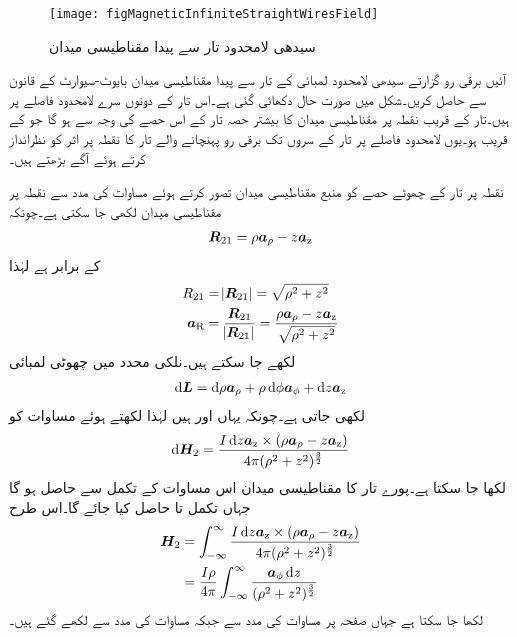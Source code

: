 \begin{figure}
\centering
\texttt{[image: figMagneticInfiniteStraightWiresField]}
\caption{سیدھی لامحدود تار سے پیدا مقناطیسی میدان}
\label{شکل_مقناطیسی_سیدھی_لامحدود_تار_کا_میدان}
\end{figure}
آئیں برقی رو گزارتے سیدھی  لامحدود لمبائی کے تار سے پیدا مقناطیسی میدان بایوٹ-سیوارٹ کے قانون سے حاصل کریں۔شکل  میں صورت حال دکھائی گئی ہے۔اس تار کے دونوں سرے لامحدود فاصلے پر ہیں۔تار کے قریب نقطہ  پر مقناطیسی میدان کا بیشتر حصہ تار کے اس حصے کی وجہ سے ہو گا جو  کے قریب ہو۔یوں لامحدود فاصلے پر تار کے سروں تک برقی رو پہنچانے  والے تار کا نقطہ  پر اثر کو نظرانداز کرتے ہوئے آگے بڑھتے ہیں۔ 

نقطہ  پر تار کے چھوٹے حصے  کو منبع مقناطیسی میدان تصور کرتے ہوئے مساوات  کی مدد سے نقطہ  پر مقناطیسی میدان لکھی جا سکتی ہے۔چونکہ 
\begin{align*}
{\ensuremath{{\boldsymbol{R}}}}_{21}=\rho {\boldsymbol{a}}_{\rho}-z {\boldsymbol{a}}_{\textup{z}}
\end{align*}
کے برابر ہے لہٰذا
\begin{align*}
R_{21}&=\abs{{{\boldsymbol{R}}}_{21}}=\sqrt{\rho^2+z^2}\\
{\boldsymbol{a}}_{\textup{R}}&=\frac{{{\boldsymbol{R}}}_{21}}{\abs{{{\boldsymbol{R}}}_{21}}}=\frac{\rho {\boldsymbol{a}}_{\rho}-z {\boldsymbol{a}}_{\textup{z}}}{\sqrt{\rho^2+z^2}}
\end{align*}
لکھے جا سکتے ہیں۔نلکی محدد میں چھوٹی لمبائی
\begin{align*}
\dif \kvec{L}=\dif \rho \arho+\rho \dif \phi \aphi+\dif z \az
\end{align*}
لکھی جاتی ہے۔چونکہ یہاں  اور  ہیں لہٰذا  لکھتے ہوئے  مساوات  کو
\begin{align*}
\dif \kvec{H}_2=\frac{I \dif z \az \times (\rho \arho -z\az)}{4 \pi (\rho^2+z^2)^{\frac{3}{2}}}
\end{align*}
لکھا جا سکتا ہے۔پورے تار کا مقناطیسی میدان اس مساوات کے تکمل سے حاصل ہو گا جہاں تکمل تا  حاصل کیا جائے گا۔اس طرح
\begin{align*}
\kvec{H}_2&=\int_{-\infty}^{\infty}\frac{I \dif z \az \times (\rho \arho -z\az)}{4 \pi (\rho^2+z^2)^{\frac{3}{2}}}\\
&=\frac{I \rho}{4\pi}\int_{-\infty}^{\infty} \frac{\aphi \dif z }{(\rho^2+z^2)^{\frac{3}{2}}}
\end{align*}    
لکھا جا سکتا ہے جہاں صفحہ  پر مساوات  کی مدد سے  جبکہ مساوات  کی مدد سے  لکھے گئے ہیں۔

